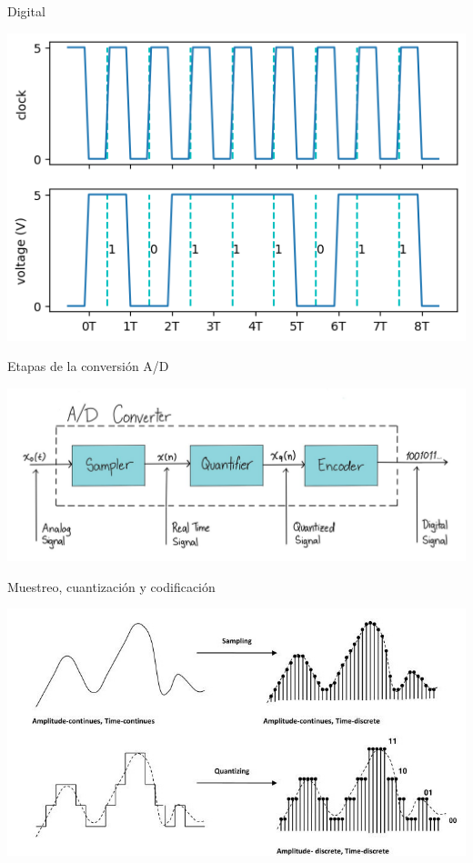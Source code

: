 \documentclass[aspectratio=169]{beamer}
\begin{document}
\begin{frame}{Digital}
\begin{center}
    \includegraphics[width=0.8\linewidth]{presentaciones/fig/digitalsignal.png}
\end{center}
\end{frame}

\begin{frame}{Etapas de la conversión A/D}
\begin{center}
    \includegraphics[width=0.93\linewidth]{presentaciones/fig/convAD.jpg}
\end{center}
\end{frame}

\begin{frame}{Muestreo, cuantización y codificación}
\begin{center}
    \includegraphics[width=0.9\linewidth]{presentaciones/fig/muestreo.jpg}
\end{center}
\end{frame}
\end{document}
